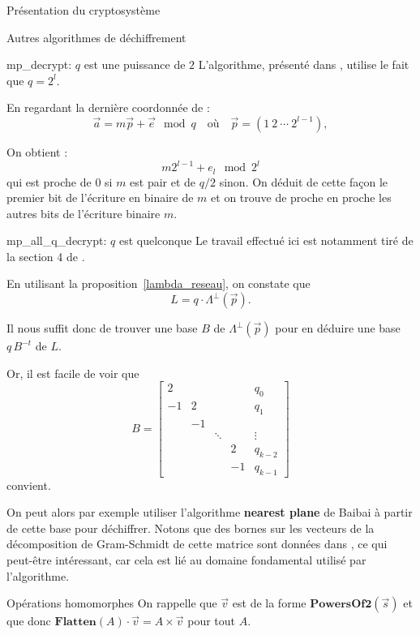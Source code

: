 \begin{section}{Présentation du cryptosystème}
\begin{subsection}{Autres algorithmes de déchiffrement}
\begin{subsubsection}{mp\_decrypt: $q$ est une puissance de $2$}
	L'algorithme, présenté dans \cite{EPRINT:GenSahWat13}, utilise le fait que $q = 2^l$.

	En regardant la dernière coordonnée de :
\[\vec{a} = m \vec{p} + \vec{e} \mod q\quad \text{où}\quad \vec{p} = (1\:2\:\cdots\:2^{l-1}), \]
 
	On obtient :
\[m 2^{l-1} + e_{l} \mod 2^l \]
	qui est proche de 0 si $m$ est pair et de $q/2$ sinon. On déduit de cette façon le premier bit de l'écriture en
	binaire de $m$ et on trouve de proche en proche les autres bits de l'écriture binaire $m$.
	
\end{subsubsection}
\begin{subsubsection}{mp\_all\_q\_decrypt: $q$ est quelconque}
	Le travail effectué ici est notamment tiré de la section 4 de \cite{EC:MicPei12}.

	En utilisant la proposition~\ref{lambda_reseau}, on constate que
\[ L = q \cdot \Lambda^\bot\left(\vec{p}\right). \]

	Il nous suffit donc de trouver une base $B$ de $\Lambda^\bot\left(\vec{p}\right)$ pour en déduire une base $q \, B^{-t}$ de $L$.

	Or, il est facile de voir que
\[ B = \begin{bmatrix} 
	2 & &&& q_0\\  
	-1 & 2 &&& q_1\\
   & -1 \\ 
	&    & \ddots & & \vdots \\
	&    &       &  2 & q_{k-2} \\
	&    &       &  -1 & q_{k-1}
\end{bmatrix}\]
convient.

On peut alors par exemple utiliser l'algorithme \textbf{nearest plane} de Baibai à partir de cette base pour déchiffrer. Notons que des bornes sur les vecteurs de la décomposition de Gram-Schmidt de cette matrice sont données dans \cite{EC:MicPei12}, ce qui peut-être intéressant, car cela est lié au domaine fondamental utilisé par l'algorithme.

\end{subsubsection}	
\end{subsection}

\begin{subsection}{Opérations homomorphes}
	On rappelle que $\vec{v}$ est de la forme $\textbf{PowersOf2}(\vec{s})$ et que donc $\textbf{Flatten}(A) \cdot \vec{v} = A \times \vec{v}$ pour tout $A$.
	

\end{subsection}
\end{section}

